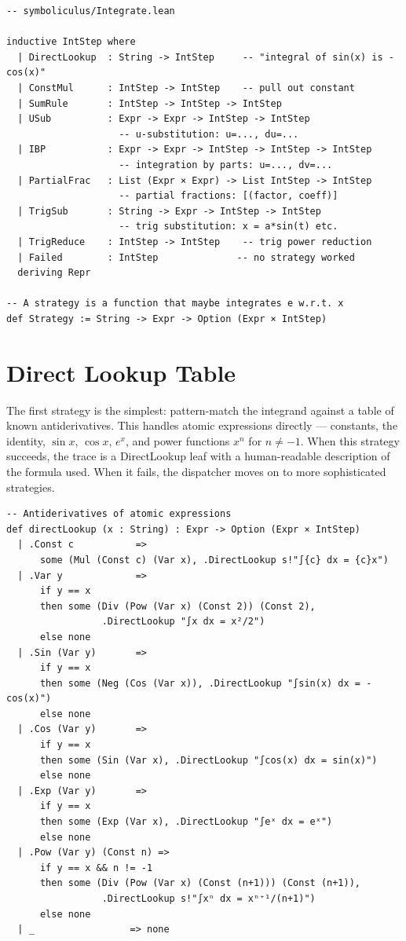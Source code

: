 \documentclass[12pt, openany]{book}
\theoremstyle{plain}
\theoremstyle{definition}
\theoremstyle{remark}
\newcommand{\li}[1]{{\ttfamily\small\color{tealaccent}#1}}
\begin{document}
\begin{leanbox}
\begin{lstlisting}
-- symboliculus/Integrate.lean

inductive IntStep where
  | DirectLookup  : String -> IntStep     -- "integral of sin(x) is -cos(x)"
  | ConstMul      : IntStep -> IntStep    -- pull out constant
  | SumRule       : IntStep -> IntStep -> IntStep
  | USub          : Expr -> Expr -> IntStep -> IntStep
                    -- u-substitution: u=..., du=...
  | IBP           : Expr -> Expr -> IntStep -> IntStep -> IntStep
                    -- integration by parts: u=..., dv=...
  | PartialFrac   : List (Expr × Expr) -> List IntStep -> IntStep
                    -- partial fractions: [(factor, coeff)]
  | TrigSub       : String -> Expr -> IntStep -> IntStep
                    -- trig substitution: x = a*sin(t) etc.
  | TrigReduce    : IntStep -> IntStep    -- trig power reduction
  | Failed        : IntStep              -- no strategy worked
  deriving Repr

-- A strategy is a function that maybe integrates e w.r.t. x
def Strategy := String -> Expr -> Option (Expr × IntStep)
\end{lstlisting}
\end{leanbox}
\color{black}

\section{Direct Lookup Table}

The first strategy is the simplest: pattern-match the integrand against a table of known antiderivatives.  This handles atomic expressions directly --- constants, the identity, $\sin x$, $\cos x$, $e^x$, and power functions $x^n$ for $n \neq -1$.  When this strategy succeeds, the trace is a \li{DirectLookup} leaf with a human-readable description of the formula used.  When it fails, the dispatcher moves on to more sophisticated strategies.

\begin{leanbox}
\begin{lstlisting}
-- Antiderivatives of atomic expressions
def directLookup (x : String) : Expr -> Option (Expr × IntStep)
  | .Const c           =>
      some (Mul (Const c) (Var x), .DirectLookup s!"∫{c} dx = {c}x")
  | .Var y             =>
      if y == x
      then some (Div (Pow (Var x) (Const 2)) (Const 2),
                 .DirectLookup "∫x dx = x²/2")
      else none
  | .Sin (Var y)       =>
      if y == x
      then some (Neg (Cos (Var x)), .DirectLookup "∫sin(x) dx = -cos(x)")
      else none
  | .Cos (Var y)       =>
      if y == x
      then some (Sin (Var x), .DirectLookup "∫cos(x) dx = sin(x)")
      else none
  | .Exp (Var y)       =>
      if y == x
      then some (Exp (Var x), .DirectLookup "∫eˣ dx = eˣ")
      else none
  | .Pow (Var y) (Const n) =>
      if y == x && n != -1
      then some (Div (Pow (Var x) (Const (n+1))) (Const (n+1)),
                 .DirectLookup s!"∫xⁿ dx = xⁿ⁺¹/(n+1)")
      else none
  | _                 => none
\end{lstlisting}
\end{leanbox}
\color{black}
\end{document}
